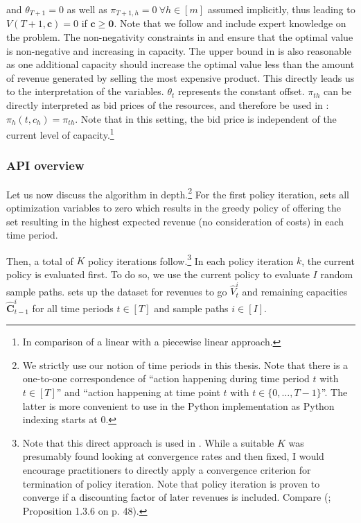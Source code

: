 and $\theta_{T+1} = 0$ as well as $\pi_{T+1, h} = 0 ~\forall h\in[m]$ assumed implicitly, thus leading to $V(T+1, \boldsymbol{c}) = 0$ if $\boldsymbol{c} \geq \boldsymbol{0}$. Note that we follow \cite{Koch.2017} and include expert knowledge on the problem. The non-negativity constraints in  and  ensure that the optimal value is non-negative and increasing in capacity. The upper bound in  is also reasonable as one additional capacity should increase the optimal value less than the amount of revenue generated by selling the most expensive product. This directly leads us to the interpretation of the variables. $\theta_t$ represents the constant offset. $\pi_{th}$ can be directly interpreted as bid prices of the resources, and therefore be used in :  $\pi_h(t, c_h) = \pi_{th}$. Note that in this setting, the bid price is independent of the current level of capacity.\footnote{In comparison of a linear with a piecewise linear approach.}

\subsubsection{API overview}

Let us now discuss the algorithm in depth.\footnote{We strictly use our notion of time periods in this thesis. Note that there is a one-to-one correspondence of \enquote{action happening during time period $t$ with $t\in[T]$} and \enquote{action happening at time point $t$ with $t\in \{0, \dots, T-1\}$}. The latter is more convenient to use in the Python implementation as Python indexing starts at $0$.} For the first policy iteration,  sets all optimization variables to zero which results in the greedy policy of offering the set resulting in the highest expected revenue (no consideration of costs) in each time period.

Then, a total of $K$ policy iterations follow.\footnote{Note that this direct approach is used in \cite{Koch.2017}. While a suitable $K$ was presumably found looking at convergence rates and then fixed, I would encourage practitioners to directly apply a convergence criterion for termination of policy iteration. Note that policy iteration is proven to converge if a discounting factor of later revenues is included. Compare \citeauthor{Bertsekas.2005}(\citeyear{Bertsekas.2005}; Proposition 1.3.6 on p. 48).} In each policy iteration $k$, the current policy is evaluated first. To do so, we use the current policy to evaluate $I$ random sample paths.  sets up the dataset for revenues to go $\hat{V}_t^i$ and remaining capacities $\boldsymbol{\hat{C}}_{t-1}^i$ for all time periods $t \in [T]$ and sample paths $i \in [I]$. 

